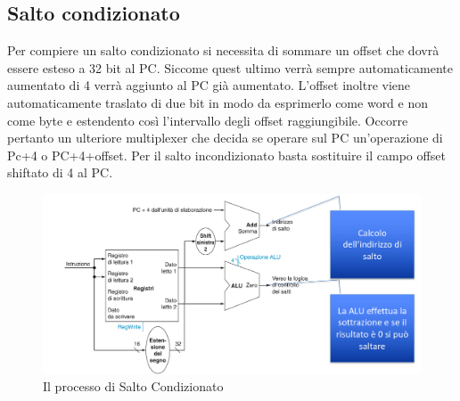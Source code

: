 \subsection{Salto condizionato}
Per compiere un salto condizionato si necessita di sommare un offset che dovr\`a essere esteso a 32 bit al PC. Siccome quest ultimo verr\`a sempre automaticamente 
aumentato di 4 verr\`a aggiunto al PC gi\`a aumentato. L'offset inoltre viene automaticamente traslato di due bit in modo da esprimerlo come word e non come byte e 
estendento cos\`i l'intervallo degli offset raggiungibile. Occorre pertanto un ulteriore multiplexer che decida se operare sul PC un'operazione di Pc+4 o PC+4+offset.
Per il salto incondizionato basta sostituire il campo offset shiftato di 4 al PC.
\begin{figure}
  \includegraphics[scale=0.2]{Pictures/SaltoCondizionato.png}
  \caption{Il processo di Salto Condizionato}
  \label{fig:boat1}
\end{figure}
